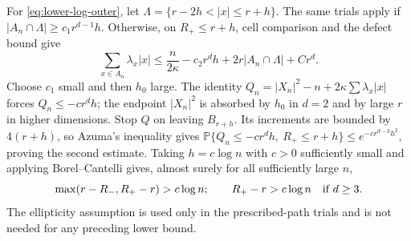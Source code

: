 For \eqref{eq:lower-log-outer}, let
$\Lambda=\{r-2h<|x|\leq r+h\}$.
The same trials apply if $|A_n\cap\Lambda|\geq c_1r^{d-1}h$.
Otherwise, on $R_+\leq r+h$, cell comparison and the defect bound
give
\[
 \sum_{x\in A_n}\lambda_x|x|
 \leq\frac{n}{2\kappa}-c_2r^dh
                     +2r|A_n\cap\Lambda|+Cr^d.
\]
Choose $c_1$ small and then $h_0$ large.  The identity
$Q_n=|X_n|^2-n+2\kappa\sum\lambda_x|x|$
forces $Q_n\leq-cr^dh$; the endpoint $|X_n|^2$ is absorbed
by $h_0$ in $d=2$ and by large $r$ in higher dimensions.
Stop $Q$ on leaving $B_{r+h}$.  Its increments are bounded by
$4(r+h)$, so Azuma's inequality gives
$\mathbb P\{Q_n\leq-cr^dh,\ R_+\leq r+h\}
\leq e^{-cr^{d-3}h^2}$, proving the second estimate.
Taking $h=c\log n$ with $c>0$ sufficiently small and applying
Borel--Cantelli gives, almost surely for all sufficiently large $n$,
\[
 \max(r-R_-,R_+-r)>c\log n;
 \qquad R_+-r>c\log n\quad\hbox{if }d\geq3.
\]
The ellipticity assumption is used only in the prescribed-path
trials and is not needed for any preceding lower bound.
